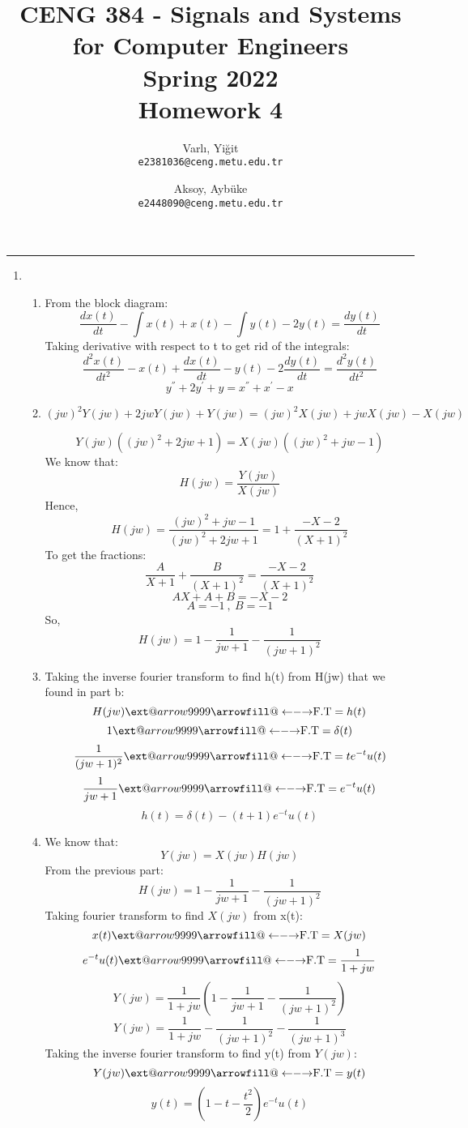 \documentclass[10pt,a4paper, margin=1in]{article}
\author{
  Varlı, Yiğit\\
  \texttt{e2381036@ceng.metu.edu.tr}
  \and
  Aksoy, Aybüke\\
  \texttt{e2448090@ceng.metu.edu.tr}
}
\title{CENG 384 - Signals and Systems for Computer Engineers \\
Spring 2022 \\
Homework 4}
\makeatletter
\newcommand\xleftrightarrow[2][]{%
  \ext@arrow 9999{\longleftrightarrowfill@}{#1}{#2}}
\newcommand\longleftrightarrowfill@{%
  \arrowfill@\leftarrow\relbar\rightarrow}
\makeatother
\begin{document}
\maketitle



\noindent\rule{19cm}{1.2pt}

\begin{enumerate}

\item %
    \begin{enumerate}
    \item %
    From the block diagram:
    \[\frac{dx(t)}{dt}-\int x(t)+x(t)-\int y(t)-2y(t)=\frac{dy(t)}{dt}\]
    Taking derivative with respect to t to get rid of the integrals:
    \[\frac{d^2x(t)}{dt^2}-x(t)+\frac{dx(t)}{dt}- y(t)-2\frac{dy(t)}{dt}=\frac{d^2y(t)}{dt^2}\]
    \[y^{''}+2y^{'}+y=x^{''}+x^{'}-x\]
    \item %
    \[(jw)^2Y(jw)+2jwY(jw)+Y(jw)=(jw)^2X(jw)+jwX(jw)-X(jw)\]
    
    \[Y(jw)((jw)^2+2jw+1)=X(jw)((jw)^2+jw-1)\]
    We know that:
    \[H(jw)=\frac{Y(jw)}{X(jw)}\]
    Hence, 
    \[H(jw)=\frac{(jw)^2+jw-1}{(jw)^2+2jw+1}=1+ \frac{-X-2}{(X+1)^2}\]
    To get the fractions:
    \[\frac{A}{X+1}+\frac{B}{(X+1)^2}=\frac{-X-2}{(X+1)^2}\]
    \[AX+A+B=-X-2\]
    \[A=-1 \ , \ B=-1\]
    So, 
    \[H(jw)=1-\frac{1}{jw+1}-\frac{1}{(jw+1)^2}\]
    \item %
    Taking the inverse fourier transform to find h(t) from H(jw) that we found in part b:
    \[H(jw)\xleftrightarrow[\text{}]{\text{F.T}}=h(t)\]
    \[1\xleftrightarrow[\text{}]{\text{F.T}}=\delta(t)\]
    \[\frac{1}{(jw+1)^2}\xleftrightarrow[\text{}]{\text{F.T}}=te^{-t}u(t)\]
    \[\frac{1}{jw+1}\xleftrightarrow[\text{}]{\text{F.T}}=e^{-t}u(t)\]
    \[h(t)=\delta(t)-(t+1)e^{-t}u(t)\]
    \item %
    We know that:
    \[Y(jw)=X(jw)H(jw)\]
    From the previous part:
    \[H(jw)=1-\frac{1}{jw+1}-\frac{1}{(jw+1)^2}\]
    Taking fourier transform to find $X(jw)$ from x(t):
    \[x(t)\xleftrightarrow[\text{}]{\text{F.T}}=X(jw)\]
    \[e^{-t}u(t)\xleftrightarrow[\text{}]{\text{F.T}}=\frac{1}{1+jw}\]
    \[Y(jw)=\frac{1}{1+jw}(1-\frac{1}{jw+1}-\frac{1}{(jw+1)^2})\]
    \[Y(jw)=\frac{1}{1+jw}-\frac{1}{(jw+1)^2}-\frac{1}{(jw+1)^3}\]
    Taking the inverse fourier transform to find y(t) from $Y(jw)$:
    \[Y(jw)\xleftrightarrow[\text{}]{\text{F.T}}=y(t)\]
    \[y(t)=(1-t-\frac{t^2}{2})e^{-t}u(t)\]
    \end{enumerate}


\end{enumerate}
\end{document}
